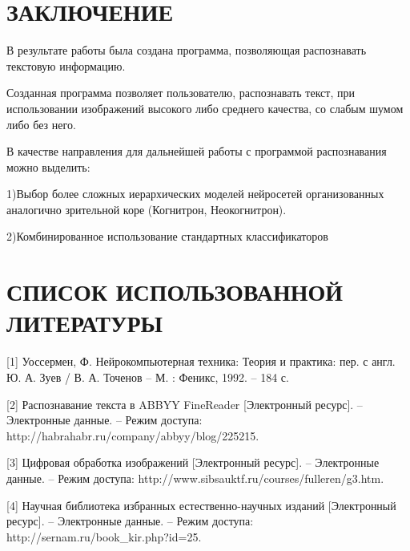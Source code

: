 \documentclass[14pt,a4paper]{extreport}
\begin{document}
 	
 	
	\newpage
	\section*{\center\normalsize ЗАКЛЮЧЕНИЕ \endcenter}
	\hspace{4ex}В результате работы была создана программа, позволяющая распознавать текстовую информацию. \

	\hspace{4ex}Созданная программа позволяет пользователю, распознавать текст, при использовании изображений высокого либо среднего качества, со слабым шумом либо без него.\

\hspace{4ex}В качестве направления для дальнейшей работы с программой распознавания  можно выделить:\

\hspace{4ex} 1)Выбор более сложных иерархических моделей нейросетей организованных аналогично зрительной коре (Когнитрон, Неокогнитрон).

\hspace{4ex} 2)Комбинированное использование стандартных классификаторов




	\newpage
	\section*{\center\normalsize СПИСОК ИСПОЛЬЗОВАННОЙ ЛИТЕРАТУРЫ \endcenter}

\hspace{4ex}[1] Уоссермен, Ф. Нейрокомпьютерная техника:  Теория и практика: пер. с англ. Ю. А. Зуев / В. А. Точенов – М. : Феникс, 1992. – 184 с.\
 
\hspace{4ex}[2] Распознавание текста в ABBYY FineReader [Электронный ресурс]. – Электронные данные. – Режим доступа: http://habrahabr.ru/company/abbyy/blog/225215.\ 

\hspace{4ex}[3] Цифровая обработка изображений [Электронный ресурс]. – Электронные данные. – Режим доступа: http://www.sibsauktf.ru/courses/fulleren/g3.htm.\

\hspace{4ex}[4] Научная библиотека избранных естественно-научных изданий [Электронный ресурс]. – Электронные данные. – Режим доступа: http://sernam.ru/book_kir.php?id=25.\
\end{document}
